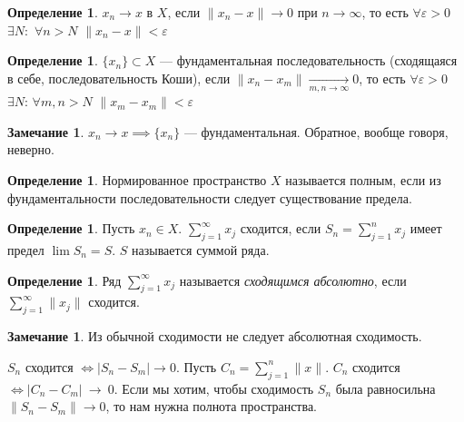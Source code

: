 \documentclass[11pt,openany,a4paper]{scrartcl}
\theoremstyle{plain}
\theoremstyle{definition}
\newtheorem{definition}[theorem]{Определение}
\newtheorem{remark}[theorem]{Замечание}
\newcommand{\underto}[1]{\xrightarrow[#1]{}}
\begin{document}
\begin{definition}
    $x_n \to x$ в $X$, если $\|x_n - x\| \to 0$ при $n \to \infty$, то есть $\forall
    \varepsilon > 0$ $\exists N$:~$\forall n > N$ $\|x_n - x\| < \varepsilon$
\end{definition}

\begin{definition}
    $\{x_n\} \subset X$ — фундаментальная последовательность (сходящаяся в себе,
    последовательность Коши), если $\|x_n - x_m\| \underto{m,n \to \infty} 0$, то есть
    $\forall \varepsilon > 0$ $\exists N$: $\forall m,n > N$ $\|x_m - x_m\| < \varepsilon$
\end{definition}

\begin{remark}
    $x_n \to x \implies \{x_n\}$ — фундаментальная. Обратное, вообще говоря, неверно.
\end{remark}
\begin{definition}
    Нормированное пространство $X$ называется полным, если из фундаментальности
    последовательности следует существование предела.
\end{definition}

\begin{definition}
    Пусть $x_n \in X$. $\sum\limits_{j = 1}^\infty x_j$ сходится, если
    $S_n = \sum\limits_{j = 1}^n x_j$ имеет предел $\lim S_n = S$. $S$ называется
    суммой ряда.
\end{definition}

\begin{definition}
    Ряд $\sum\limits_{j = 1}^\infty x_j$ называется \emph{сходящимся абсолютно},
    если $\sum\limits_{j = 1}^\infty \|x_j\|$ сходится.
\end{definition}
\begin{remark}
    Из обычной сходимости не следует абсолютная сходимость.
\end{remark}

$S_n$ сходится $\iff |S_n - S_m| \to 0$. Пусть $C_n = \sum\limits_{j = 1}^n \|x\|$.
$C_n$ сходится $\iff |C_n - C_m|~\to~0$.
Если мы хотим, чтобы сходимость $S_n$ была равносильна
$\|S_n - S_m\| \to 0$, то нам нужна полнота пространства.
\end{document}

